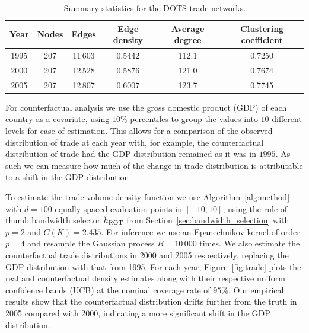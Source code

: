 \begin{table}[b!]
  \centering
  \begin{tabular}{|c|c|c|c|c|c|}
    \hline
    Year & Nodes & Edges & Edge density & Average degree
    & Clustering coefficient \\
    \hline
    1995 & 207 & 11\,603 & 0.5442 & 112.1 & 0.7250 \\
    2000 & 207 & 12\,528 & 0.5876 & 121.0 & 0.7674 \\
    2005 & 207 & 12\,807 & 0.6007 & 123.7 & 0.7745 \\
    \hline
  \end{tabular}
  \caption[Summary statistics for the DOTS trade networks]{
  Summary statistics for the DOTS trade networks.}
  \label{tab:trade_network_stats}
\end{table}

For counterfactual analysis we use the gross domestic product (GDP) of each
country as a covariate, using $10\%$-percentiles to group the values into $10$
different levels for ease of estimation. This allows for a comparison of the
observed distribution of trade at each year with, for example, the
counterfactual distribution of trade had the GDP distribution remained as it
was in $1995$. As such we can measure how much of the change in trade
distribution is attributable to a shift in the GDP distribution.

To estimate the trade volume density function we use Algorithm~\ref{alg:method}
with $d=100$ equally-spaced evaluation points in $[-10,10]$, using the
rule-of-thumb bandwidth selector $\hat h_{\operatorname{ROT}}$ from
Section~\ref{sec:bandwidth_selection} with $p=2$ and $C(K) = 2.435$. For
inference we use an Epanechnikov kernel of order $p=4$ and resample the
Gaussian process $B = 10\,000$ times. We also estimate the counterfactual trade
distributions in 2000 and 2005 respectively, replacing the GDP distribution
with that from 1995. For each year, Figure~\ref{fig:trade} plots the real and
counterfactual density estimates along with their respective uniform confidence
bands (UCB) at the nominal coverage rate of $95\%$. Our empirical results show
that the counterfactual distribution drifts further from the truth in 2005
compared with 2000, indicating a more significant shift in the GDP
distribution.


